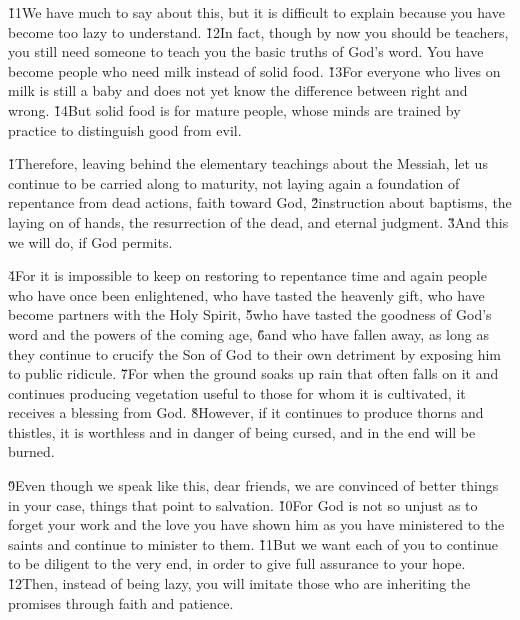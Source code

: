 \v{11}We have much to say about this, but it is difficult to explain because you have become too lazy to understand. \v{12}In fact, though by now you should be teachers, you still need someone to teach you the basic truths of God's word. You have become people who need milk instead of solid food. \v{13}For everyone who lives on milk is still a baby and does not yet know the difference between right and wrong. \v{14}But solid food is for mature people, whose minds are trained by practice to distinguish good from evil.

\v{1}Therefore, leaving behind the elementary teachings about the Messiah, let us continue to be carried along to maturity, not laying again a foundation of repentance from dead actions, faith toward God, \v{2}instruction about baptisms, the laying on of hands, the resurrection of the dead, and eternal judgment. \v{3}And this we will do, if God permits.

\v{4}For it is impossible to keep on restoring to repentance time and again people who have once been enlightened, who have tasted the heavenly gift, who have become partners with the Holy Spirit, \v{5}who have tasted the goodness of God's word and the powers of the coming age, \v{6}and who have fallen away, as long as they continue to crucify the Son of God to their own detriment by exposing him to public ridicule. \v{7}For when the ground soaks up rain that often falls on it and continues producing vegetation useful to those for whom it is cultivated, it receives a blessing from God. \v{8}However, if it continues to produce thorns and thistles, it is worthless and in danger of being cursed, and in the end will be burned.

\v{9}Even though we speak like this, dear friends, we are convinced of better things in your case, things that point to salvation. \v{10}For God is not so unjust as to forget your work and the love you have shown him as you have ministered to the saints and continue to minister to them. \v{11}But we want each of you to continue to be diligent to the very end, in order to give full assurance to your hope. \v{12}Then, instead of being lazy, you will imitate those who are inheriting the promises through faith and patience.

